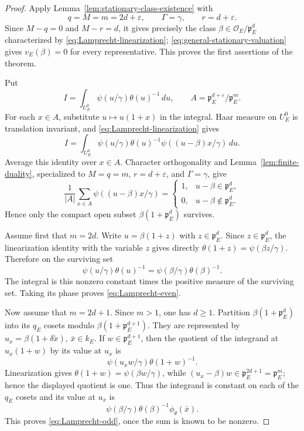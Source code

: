 \documentclass[11pt]{amsart}
\theoremstyle{definition}
\theoremstyle{remark}
\newcommand{\cO}{\mathcal O}
\newcommand{\p}{\mathfrak p}
\begin{document}
\begin{proof}
Apply Lemma~\ref{lem:stationary-class-existence} with
\[
 q=M=m=2d+\varepsilon,
 \qquad \Gamma=\gamma,
 \qquad r=d+\varepsilon.
\]
Since $M-q=0$ and $M-r=d$, it gives precisely the class
$\beta\in\cO_E/\p_E^d$ characterized by
\eqref{eq:Lamprecht-linearization};
\eqref{eq:general-stationary-valuation} gives $v_E(\beta)=0$ for every
representative.  This proves the first assertions of the theorem.

Put
\[
 I=\int_{U_E^0}\psi(u/\gamma)\theta(u)^{-1}\,du,
 \qquad A=\p_E^{d+\varepsilon}/\p_E^m.
\]
For each $x\in A$, substitute $u\mapsto u(1+x)$ in the integral.  Haar
measure on $U_E^0$ is translation invariant, and
\eqref{eq:Lamprecht-linearization} gives
\[
 I=\int_{U_E^0}\psi(u/\gamma)\theta(u)^{-1}
       \psi((u-\beta)x/\gamma)\,du.
\]
Average this identity over $x\in A$.  Character orthogonality and
Lemma~\ref{lem:finite-duality}, specialized to
$M=q=m$, $r=d+\varepsilon$, and $\Gamma=\gamma$, give
\begin{equation}\label{eq:Lamprecht-selector}
 \frac1{|A|}\sum_{x\in A}\psi((u-\beta)x/\gamma)
 =\begin{cases}
 1,&u-\beta\in\p_E^d,\\
 0,&u-\beta\notin\p_E^d.
 \end{cases}
\end{equation}
Hence only the compact open subset
$\beta(1+\p_E^d)$ survives.

Assume first that $m=2d$.  Write $u=\beta(1+z)$ with
$z\in\p_E^d$.  Since $z\in\p_E^d$, the linearization identity with the variable $z$ gives directly
$\theta(1+z)=\psi(\beta z/\gamma)$.  Therefore on the surviving set
\[
 \psi(u/\gamma)\theta(u)^{-1}
 =\psi(\beta/\gamma)\theta(\beta)^{-1}.
\]
The integral is this nonzero constant times the positive measure of the
surviving set.  Taking its phase proves \eqref{eq:Lamprecht-even}.

Now assume that $m=2d+1$.  Since $m>1$, one has $d\ge1$.  Partition
$\beta(1+\p_E^d)$ into its $q_E$ cosets modulo
$\beta(1+\p_E^{d+1})$.  They are represented by
$u_x=\beta(1+\delta\widetilde x)$, $\bar x\in k_E$.  If
$w\in\p_E^{d+1}$, then the quotient of the integrand at
$u_x(1+w)$ by its value at $u_x$ is
\[
 \psi(u_xw/\gamma)\theta(1+w)^{-1}.
\]
Linearization gives $\theta(1+w)=\psi(\beta w/\gamma)$, while
$(u_x-\beta)w\in\p_E^{2d+1}=\p_E^m$; hence the displayed quotient is
one.  Thus the integrand is constant on each of the $q_E$ cosets and
its value at $u_x$ is
\[
 \psi(\beta/\gamma)\theta(\beta)^{-1}\phi_\theta(\bar x).
\]
This proves \eqref{eq:Lamprecht-odd}, once the sum is known to be
nonzero.


\end{proof}
\end{document}
